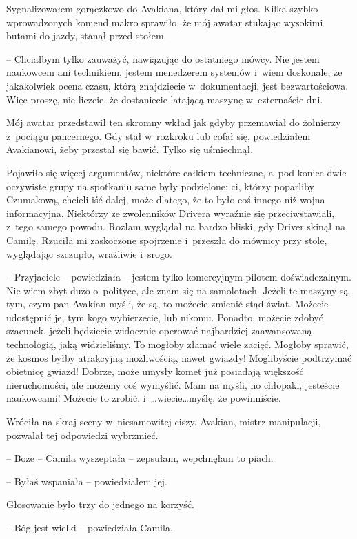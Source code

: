 \documentclass[oneside,polish,12pt,sfheadings]{mwbk}
\begin{document}
Sygnalizowałem gorączkowo do Avakiana, który dał mi głos. Kilka szybko
wprowadzonych komend makro sprawiło, że mój awatar stukając wysokimi
butami do jazdy, stanął przed stołem.

-- Chciałbym tylko zauważyć, nawiązując do ostatniego mówcy. Nie jestem
naukowcem ani technikiem, jestem menedżerem systemów i~wiem doskonale,
że jakakolwiek ocena czasu, którą znajdziecie w~dokumentacji, jest
bezwartościowa. Więc proszę, nie liczcie, że dostaniecie latającą
maszynę w~czternaście dni.

Mój awatar przedstawił ten skromny wkład jak gdyby przemawiał do
żołnierzy z~pociągu pancernego. Gdy stał w~rozkroku lub cofał się,
powiedziałem Avakianowi, żeby przestał się bawić. Tylko się uśmiechnął.

Pojawiło się więcej argumentów, niektóre całkiem techniczne, a~pod
koniec dwie oczywiste grupy na spotkaniu same były podzielone: ci,
którzy poparliby Czumakową, chcieli iść dalej, może dlatego, że to było
coś innego niż wojna informacyjna. Niektórzy ze zwolenników Drivera
wyraźnie się przeciwstawiali, z~tego samego powodu. Rozłam wyglądał na
bardzo bliski, gdy Driver skinął na Camilę. Rzuciła mi zaskoczone
spojrzenie i~przeszła do mównicy przy stole, wyglądając szczupło,
wrażliwie i~srogo.

-- Przyjaciele -- powiedziała -- jestem tylko komercyjnym pilotem
doświadczalnym. Nie wiem zbyt dużo o~polityce, ale znam się na
samolotach. Jeżeli te maszyny są tym, czym pan Avakian myśli, że są, to
możecie zmienić stąd świat. Możecie udostępnić je, tym kogo wybierzecie,
lub nikomu. Ponadto, możecie zdobyć szacunek, jeżeli będziecie widocznie
operować najbardziej zaawansowaną technologią, jaką widzieliśmy. To
mogłoby złamać wiele zacięć. Mogłoby sprawić, że kosmos byłby atrakcyjną
możliwością, nawet gwiazdy! Moglibyście podtrzymać obietnicę gwiazd!
Dobrze, może umysły komet już posiadają większość nieruchomości, ale
możemy coś wymyślić. Mam na myśli, no chłopaki, jesteście naukowcami!
Możecie to zrobić, i~\ldots wiecie\ldots myślę, że powinniście.

Wróciła na skraj sceny w~niesamowitej ciszy. Avakian, mistrz
manipulacji, pozwalał tej odpowiedzi wybrzmieć.

-- Boże -- Camila wyszeptała -- zepsułam, wepchnęłam to piach.

-- Byłaś wspaniała -- powiedziałem jej.

Głosowanie było trzy do jednego na korzyść.

-- Bóg jest wielki -- powiedziała Camila.
\end{document}
